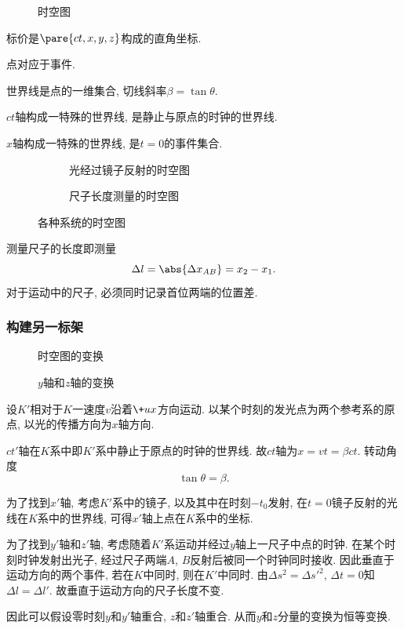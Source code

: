 \documentclass[hidelinks]{ctexart}
\begin{document}
\begin{figure}[ht]
    \centering
    \caption{时空图}
\end{figure}
标价是$\pare{ct,x,y,z}$构成的直角坐标.
\begin{cenum}
    \item 点对应于事件.
    \item 世界线是点的一维集合, 切线斜率$\beta = \tan \theta$.
    \item $ct$轴构成一特殊的世界线, 是静止与原点的时钟的世界线.
    \item $x$轴构成一特殊的世界线, 是$t=0$的事件集合.
\end{cenum}
\begin{figure}[ht]
    \centering
    \begin{subfigure}[b]{.45\textwidth}
        \centering
        \caption{光经过镜子反射的时空图}
    \end{subfigure}
    \begin{subfigure}[b]{.45\textwidth}
        \centering
        \caption{尺子长度测量的时空图}
    \end{subfigure}
    \caption{各种系统的时空图}
\end{figure}
测量尺子的长度即测量
\[ \Delta l = \abs{\Delta x_{AB}} = x_2 - x_1. \]
对于运动中的尺子, 必须同时记录首位两端的位置差.


\subsubsection{构建另一标架} %
\label{ssub:构建另一标架}

\begin{figure}[ht]
    \centering
    \caption{时空图的变换}
\end{figure}
\begin{figure}[ht]
    \centering
    \caption{$y$轴和$z$轴的变换}
\end{figure}
设$K'$相对于$K$一速度$v$沿着$\+ux$方向运动. 以某个时刻的发光点为两个参考系的原点, 以光的传播方向为$x$轴方向.
\begin{cenum}
    \item $ct'$轴在$K$系中即$K'$系中静止于原点的时钟的世界线. 故$ct$轴为$x = vt = \beta ct$. 转动角度
    \[ \tan \theta = \beta. \]
    \item 为了找到$x'$轴, 考虑$K'$系中的镜子, 以及其中在时刻$-t_0$发射, 在$t=0$镜子反射的光线在$K$系中的世界线, 可得$x'$轴上点在$K$系中的坐标.
    \item 为了找到$y'$轴和$z'$轴, 考虑随着$K'$系运动并经过$y$轴上一尺子中点的时钟. 在某个时刻时钟发射出光子, 经过尺子两端$A$, $B$反射后被同一个时钟同时接收. 因此垂直于运动方向的两个事件, 若在$K$中同时, 则在$K'$中同时. 由$\Delta s^2 = \Delta s'^2$, $\Delta t = 0$知$\Delta l = \Delta l'$. 故垂直于运动方向的尺子长度不变.
    \par
    因此可以假设零时刻$y$和$y'$轴重合, $z$和$z'$轴重合. 从而$y$和$z$分量的变换为恒等变换.
\end{cenum}
\end{document}
